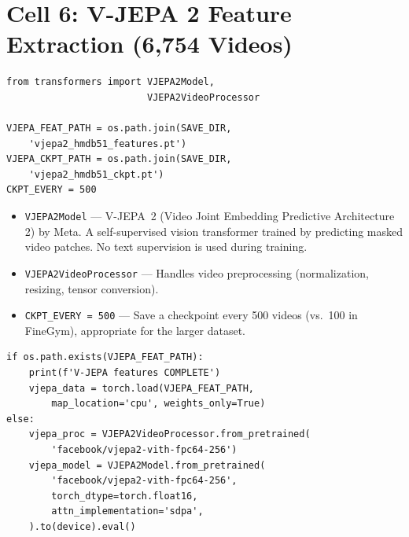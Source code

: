 \newpage
\section{Cell 6: V-JEPA 2 Feature Extraction (6,754 Videos)}

\begin{lstlisting}
from transformers import VJEPA2Model,
                         VJEPA2VideoProcessor

VJEPA_FEAT_PATH = os.path.join(SAVE_DIR,
    'vjepa2_hmdb51_features.pt')
VJEPA_CKPT_PATH = os.path.join(SAVE_DIR,
    'vjepa2_hmdb51_ckpt.pt')
CKPT_EVERY = 500
\end{lstlisting}

\begin{explanation}
\begin{itemize}[nosep]
  \item \texttt{VJEPA2Model} --- V-JEPA~2 (Video Joint Embedding Predictive Architecture 2) by Meta. A self-supervised vision transformer trained by predicting masked video patches. No text supervision is used during training.
  \item \texttt{VJEPA2VideoProcessor} --- Handles video preprocessing (normalization, resizing, tensor conversion).
  \item \texttt{CKPT\_EVERY = 500} --- Save a checkpoint every 500 videos (vs.\ 100 in FineGym), appropriate for the larger dataset.
\end{itemize}
\end{explanation}

\begin{lstlisting}
if os.path.exists(VJEPA_FEAT_PATH):
    print(f'V-JEPA features COMPLETE')
    vjepa_data = torch.load(VJEPA_FEAT_PATH,
        map_location='cpu', weights_only=True)
else:
    vjepa_proc = VJEPA2VideoProcessor.from_pretrained(
        'facebook/vjepa2-vith-fpc64-256')
    vjepa_model = VJEPA2Model.from_pretrained(
        'facebook/vjepa2-vith-fpc64-256',
        torch_dtype=torch.float16,
        attn_implementation='sdpa',
    ).to(device).eval()
\end{lstlisting}

